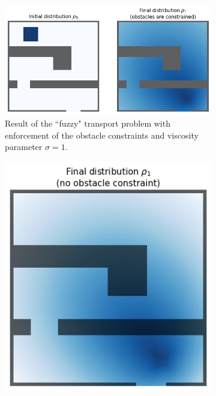 \documentclass[../report.tex]{subfiles}
\begin{document}
\begin{figure}
	\centering
	\begin{subfigure}{.82\linewidth}
	\includegraphics[width=\linewidth]{../project/images/fuzzy_transport_withobstacle.png}
	\caption{Result of the ``fuzzy" transport problem with enforcement of the obstacle constraints and viscosity parameter $\sigma=1$.}\label{fig:2MargFuzzyTransportObstacles}
	\end{subfigure}
	\begin{subfigure}[t]{.4\linewidth}
	\centering
	\includegraphics[width=\linewidth]{../project/images/fuzzy_transport_noobstacle.png}

\end{subfigure}
\end{figure}
\end{document}
